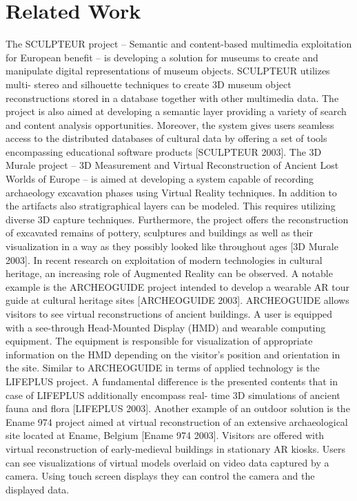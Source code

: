   
\section{Related Work}
The SCULPTEUR project – Semantic and content-based multimedia exploitation for European benefit – is developing a solution for museums to create and manipulate digital representations of museum objects. SCULPTEUR utilizes multi- stereo and silhouette techniques to create 3D museum object reconstructions stored in a database together with other multimedia data. The project is also aimed at developing a semantic layer providing a variety of search and content analysis opportunities. Moreover, the system gives users seamless access to the distributed databases of cultural data by offering a set of tools encompassing educational software products [SCULPTEUR 2003].
The 3D Murale project – 3D Measurement and Virtual Reconstruction of Ancient Lost Worlds of Europe – is aimed at developing a system capable of recording archaeology excavation phases using Virtual Reality techniques. In addition to the artifacts also stratigraphical layers can be modeled. This requires utilizing diverse 3D capture techniques. Furthermore, the project offers the reconstruction of excavated remains of pottery, sculptures and buildings as well as their visualization in a way as they possibly looked like throughout ages [3D Murale 2003].
In recent research on exploitation of modern technologies in cultural heritage, an increasing role of Augmented Reality can be observed. A notable example is the ARCHEOGUIDE project intended to develop a wearable AR tour guide at cultural heritage sites [ARCHEOGUIDE 2003]. ARCHEOGUIDE allows visitors to see virtual reconstructions of ancient buildings. A user is equipped with a see-through Head-Mounted Display (HMD) and wearable computing equipment. The equipment is responsible for visualization of appropriate information on the HMD depending on the visitor’s position and orientation in the site. Similar to ARCHEOGUIDE in terms of applied technology is the LIFEPLUS project. A fundamental difference is the presented contents that in case of LIFEPLUS additionally encompass real- time 3D simulations of ancient fauna and flora [LIFEPLUS 2003].
Another example of an outdoor solution is the Ename 974 project aimed at virtual reconstruction of an extensive archaeological site located at Ename, Belgium [Ename 974 2003]. Visitors are offered with virtual reconstruction of early-medieval buildings in stationary AR kiosks. Users can see visualizations of virtual models overlaid on video data captured by a camera. Using touch screen displays they can control the camera and the displayed data.

